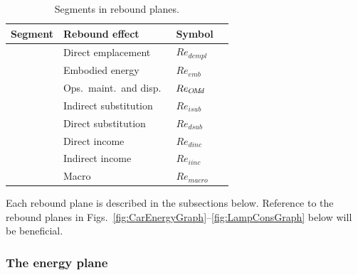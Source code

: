 \documentclass[12pt]{article}\usepackage[]{graphicx}\usepackage[]{xcolor}
\begin{document}
\begin{table}
\footnotesize
\centering %
\caption{Segments in rebound planes.}
\begin{tabular}{r l l c}
  \toprule
  \multicolumn{1}{c}{Segment} & Rebound effect             & Symbol           \\
  \midrule
  \circa{} \hspace{48.8mm}    & Direct emplacement         & $Re_{dempl}$     \\
  \ab{}    \hspace{42.0mm}    & Embodied energy            & $Re_{emb}$       \\
  \bstar{} \hspace{35.2mm}    & Ops.\, maint.\, and disp.\ & $Re_{O\!M\!d}$       \\
  \midrule
  \starc{} \hspace{28.8mm}    & Indirect substitution      & $Re_{isub}$      \\
  \chat{}  \hspace{21.6mm}    & Direct substitution        & $Re_{dsub}$      \\
  \midrule
  \hatd{}  \hspace{14.8mm}    & Direct income              & $Re_{dinc}$      \\
  \dbar{}  \hspace{ 7.1mm}    & Indirect income            & $Re_{iinc}$      \\
  \midrule
  \bartilde{}                 & Macro                      & $Re_{macro}$     \\
  \bottomrule
\end{tabular}
\label{tab:path_graph_segments}
\end{table}

Each rebound plane is described in the subsections below.
Reference to the rebound planes in
Figs.~\ref{fig:CarEnergyGraph}--\ref{fig:LampConsGraph}
below will be beneficial.


\subsubsection{The energy plane}
\label{sec:energy_path_graphs}
\end{document}
